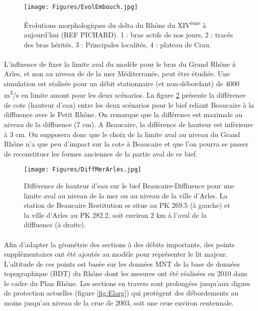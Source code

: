 \documentclass[11pt]{article}
\begin{document}
	\begin{figure}[h]
		\centering
	    \texttt{[image: Figures/EvolEmbouch.jpg]}
        \caption{Évolutions morphologiques du delta du Rhône du XIV\textsuperscript{ème} à aujourd'hui (REF PICHARD). 1 : bras actifs de nos jours, 2 : tracés des bras hérités, 3 : Principales localités, 4 : plateau de Crau.}
		\label{fig:Embouch}
	\end{figure}

	\paragraph{} L'influence de fixer la limite aval du modèle pour le bras du Grand Rhône à Arles, et non au niveau de de la mer Méditerranée, peut être étudiée. Une simulation est réalisée pour un débit stationnaire (et non-débordant) de 4000 m\textsuperscript{3}/s en limite amont pour les deux scénarios. La figure \ref{fig:DifMerArles} présente la différence de cote (hauteur d'eau) entre les deux scénarios pour le bief reliant Beaucaire à la diffluence avec le Petit Rhône. On remarque que la différence est maximale au niveau de la diffluence (7 cm). A Beaucaire, la différence de hauteur est inférieure à 3 cm. On supposera donc que le choix de la limite aval au niveau du Grand Rhône n'a que peu d'impact sur la cote à Beaucaire et que l'on pourra se passer de reconstituer les formes anciennes de la partie aval de ce bief. 
	 
	\begin{figure}[h]
	\centering
		\texttt{[image: Figures/DiffMerArles.jpg]}
        \caption{Différence de hauteur d'eau sur le bief Beaucaire-Diffluence pour une limite aval au niveau de la mer ou au niveau de la ville d'Arles. La station de Beaucaire Restitution se situe au PK 269.5 (à gauche) et la ville d'Arles au PK 282.2, soit environ 2 km à l'aval de la diffluence (à droite).}
		\label{fig:DifMerArles}
	\end{figure}			 
	 
	\paragraph{} Afin d'adapter la géométrie des sections à des débits importants, des points supplémentaires ont été ajoutés au modèle pour représenter le lit majeur. L'altitude de ces points est basée sur les données MNT de la base de données topographique (BDT) du Rhône dont les mesures ont été réalisées en 2010 dans le cadre du Plan Rhône. Les sections en travers sont prolongées jusqu'aux digues de protection actuelles (figure \ref{fig:Elarg}) qui protègent des débordements au moins jusqu'au niveau de la crue de 2003, soit une crue environ centennale. 
	
\end{document}
